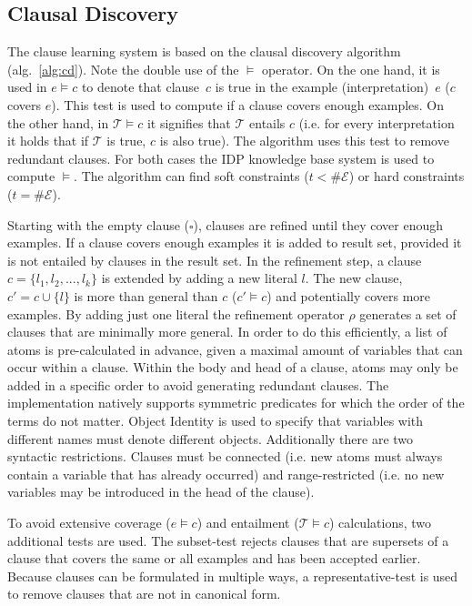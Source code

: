 \documentclass[letterpaper]{article}
\newcommand{\sym}[1]{\ensuremath{\mathcal{#1}}}
\theoremstyle{definition}
\begin{document}
\subsection{Clausal Discovery}
The clause learning system is based on the clausal discovery algorithm (alg.~\ref{alg:cd}).
Note the double use of the $\models$ operator.
On the one hand, it is used in $e \models c$ to denote that clause~$c$ is true in the example (interpretation)~$e$ ($c$ covers $e$).
This test is used to compute if a clause covers enough examples.
On the other hand, in $\sym{T} \models c$ it signifies that \sym{T} entails $c$ (i.e. for every interpretation it holds that if \sym{T} is true, $c$ is also true).
The algorithm uses this test to remove redundant clauses.
For both cases the IDP knowledge base system \cite{de2013prototype,wittocx2008idp} is used to compute $\models$.
The algorithm can find soft constraints ($t < \# \sym{E}$) or hard constraints ($t = \# \sym{E}$).

Starting with the empty clause ($\square$), clauses are refined until they cover enough examples.
If a clause covers enough examples it is added to result set, provided it is not entailed by clauses in the result set.
In the refinement step, a clause $c = \{l_1, l_2, ..., l_k\}$ is extended by adding a new literal $l$.
The new clause, $c' = c \cup \{l\}$ is more than general than $c$ ($c' \models c$) and potentially covers more examples.
By adding just one literal the refinement operator $\rho$ generates a set of clauses that are minimally more general.
In order to do this efficiently, a list of atoms is pre-calculated in advance, given a maximal amount of variables that can occur within a clause.
Within the body and head of a clause, atoms may only be added in a specific order to avoid generating redundant clauses.
The implementation natively supports symmetric predicates for which the order of the terms do not matter.
Object Identity is used to specify that variables with different names must denote different objects.
Additionally there are two syntactic restrictions.
Clauses must be connected (i.e. new atoms must always contain a variable that has already occurred) and range-restricted (i.e. no new variables may be introduced in the head of the clause).

To avoid extensive coverage ($e \models c$) and entailment ($\sym{T} \models c$) calculations, two additional tests are used.
The subset-test rejects clauses that are supersets of a clause that covers the same or all examples and has been accepted earlier.
Because clauses can be formulated in multiple ways, a representative-test is used to remove clauses that are not in canonical form.
\end{document}
